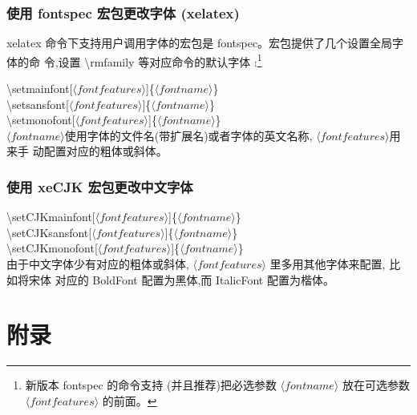 \documentclass[a4paper]{ctexart}
\begin{document}
    \subsubsection{使用 fontspec 宏包更改字体 (xelatex)}
    xelatex 命令下支持用户调用字体的宏包是 fontspec。宏包提供了几个设置全局字体的命 令,设置 %
    \textbackslash rmfamily 等对应命令的默认字体 :\footnote{新版本 fontspec 的命令支持%
    (并且推荐)把必选参数 $\langle font name\rangle$ 放在可选参数$\langle font features\rangle$ 的前面。}\par
    \textbackslash setmainfont[$\langle font features\rangle$]\{$\langle font name\rangle$\} \\
    \textbackslash setsansfont[$\langle font features\rangle$]\{$\langle font name\rangle$\} \\
    \textbackslash setmonofont[$\langle font features\rangle$]\{$\langle font name\rangle$\}\\
    $\langle font name\rangle$使用字体的文件名(带扩展名)或者字体的英文名称, %
    $\langle font features\rangle$用来手 动配置对应的粗体或斜体。\par
    \subsubsection{使用 xeCJK 宏包更改中文字体}
    \textbackslash setCJKmainfont[$\langle font features\rangle$]\{$\langle font name\rangle$\} \\ 
    \textbackslash setCJKsansfont[$\langle font features\rangle$]\{$\langle font name\rangle$\} \\ 
    \textbackslash setCJKmonofont[$\langle font features\rangle$]\{$\langle font name\rangle$\}\\
    由于中文字体少有对应的粗体或斜体, $\langle font features\rangle$ 里多用其他字体来配置,%
    比如将宋体 对应的 BoldFont 配置为黑体,而 ItalicFont 配置为楷体。
    \newpage
    \appendix
    \section{附录}
\end{document}
